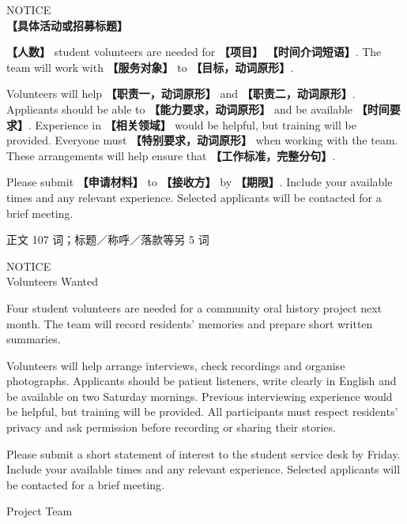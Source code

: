 \documentclass[11pt,a4paper,fontset=macnew]{ctexart}
\newenvironment{writing}{\begingroup\fontsize{10.5}{13.5}\selectfont\setlength{\parskip}{3pt}}{\par\endgroup}
\newenvironment{example}{\begingroup\fontsize{11}{14.3}\selectfont\setlength{\parskip}{4pt}}{\par\endgroup}
\begin{document}
\begin{writing}
{\centering NOTICE\\{\bfseries 【具体活动或招募标题】}\par}
{\bfseries 【人数】} student volunteers are needed for {\bfseries 【项目】} {\bfseries 【时间介词短语】}. The team will work with {\bfseries 【服务对象】} to {\bfseries 【目标，动词原形】}.

Volunteers will help {\bfseries 【职责一，动词原形】} and {\bfseries 【职责二，动词原形】}. Applicants should be able to {\bfseries 【能力要求，动词原形】} and be available {\bfseries 【时间要求】}. Experience in {\bfseries 【相关领域】} would be helpful, but training will be provided. Everyone must {\bfseries 【特别要求，动词原形】} when working with the team. These arrangements will help ensure that {\bfseries 【工作标准，完整分句】}.

Please submit {\bfseries 【申请材料】} to {\bfseries 【接收方】} by {\bfseries 【期限】}. Include your available times and any relevant experience. Selected applicants will be contacted for a brief meeting.

\par
\end{writing}
\par\vspace{4pt}{\bfseries 完整套用示例}\par\nopagebreak
{\small 正文 107 词；标题／称呼／落款等另 5 词}\par
\begin{example}
{\centering NOTICE\\Volunteers Wanted\par}
Four student volunteers are needed for a community oral history project next month. The team will record residents' memories and prepare short written summaries.

Volunteers will help arrange interviews, check recordings and organise photographs. Applicants should be patient listeners, write clearly in English and be available on two Saturday mornings. Previous interviewing experience would be helpful, but training will be provided. All participants must respect residents' privacy and ask permission before recording or sharing their stories.

Please submit a short statement of interest to the student service desk by Friday. Include your available times and any relevant experience. Selected applicants will be contacted for a brief meeting.

\noindent Project Team\par
\end{example}
\end{document}
